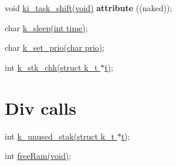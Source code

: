 \begin{DoxyItemize}
\item void \hyperlink{krnl_8h_a9910c513b91fd26369e121b1d6d1ee72}{ki\+\_\+task\+\_\+shift(void)} {\bfseries attribute} ((naked));
\item char \hyperlink{krnl_8h_a56febc95937d41bc48b48b6fdd6f6987}{k\+\_\+sleep(int time)};
\item char \hyperlink{krnl_8h_a77ca854c9aa048f21a82d7a9b3e7c070}{k\+\_\+set\+\_\+prio(char prio)};
\item int \hyperlink{krnl_8h_a290d756b6f6023ccc202155eb0140843}{k\+\_\+stk\+\_\+chk(struct k\+\_\+t $\ast$t)};
\end{DoxyItemize}\hypertarget{index_a9}{}\section{Div calls}\label{index_a9}

\begin{DoxyItemize}
\item int \hyperlink{krnl_8h_aab50fd7741fd86d4215ecc6aceb892a3}{k\+\_\+unused\+\_\+stak(struct k\+\_\+t $\ast$t)};
\item int \hyperlink{krnl_8h_abde03a57484eac43bffbad24df5fc794}{free\+Ram(void)}; 
\end{DoxyItemize}